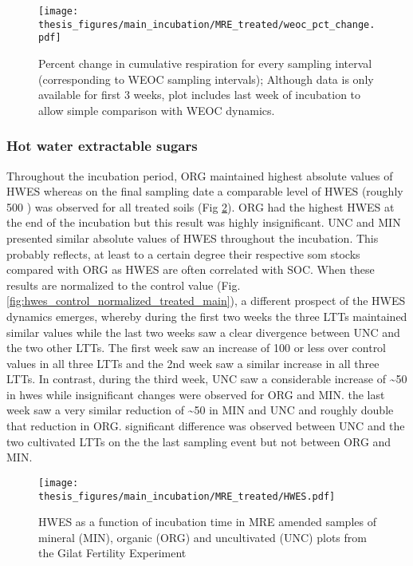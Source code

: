\documentclass[12pt]{report}
\begin{document}
		\begin{figure}[H]
			\centering
			\texttt{[image: thesis\_figures/main\_incubation/MRE\_treated/weoc\_pct\_change.pdf]}
			\caption{Percent change in cumulative respiration for every sampling interval (corresponding to WEOC sampling intervals); Although data is only available for first 3 weeks, plot includes last week of incubation to allow simple comparison with WEOC dynamics.}
			\label{fig:weoc_pct_change_treated_main}
		\end{figure}
		
		\subsubsection{Hot water extractable sugars}
		Throughout the incubation period, ORG maintained highest absolute values of HWES whereas on the final sampling date a comparable level of HWES (roughly 500 \genericunit) was observed for all treated soils (Fig \ref{fig:hwes_treated_main}). ORG  had the highest HWES at the end of the incubation but this result was highly insignificant. UNC and MIN presented similar absolute values of HWES throughout the incubation. This probably reflects, at least to a certain degree their respective \gls{som} stocks compared with ORG as HWES are often correlated with SOC.
		When these results are normalized to the control value (Fig. \ref{fig:hwes_control_normalized_treated_main}), a different prospect of the HWES dynamics emerges, whereby during the first two weeks the three LTTs maintained similar values while the last two weeks saw a clear divergence between UNC and the two other LTTs. The first week saw an increase of 100 \genericunit or less over control values in all three LTTs and the 2nd week saw a similar increase in all three LTTs. In contrast, during the third week, UNC saw a considerable increase of \~{}50 \genericunit in \gls{hwes} while insignificant changes were observed for ORG and MIN. the last week saw a very similar reduction of \~{}50 \genericunit in MIN and UNC and roughly double that reduction in ORG. significant difference was observed between UNC and the two cultivated LTTs on the the last sampling event but not between ORG and MIN.
		
		\begin{figure}[H]
			\centering
			\texttt{[image: thesis\_figures/main\_incubation/MRE\_treated/HWES.pdf]}
			\caption{ \footnotesize	HWES as a function of incubation time in MRE amended samples of mineral (MIN), organic (ORG) and uncultivated (UNC) plots from the Gilat Fertility Experiment}
			\label{fig:hwes_treated_main}
		\end{figure}
		
\end{document}
